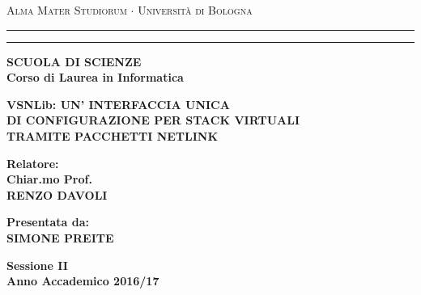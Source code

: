 \documentclass[12pt,a4paper]{report}
\begin{document}
\begin{titlepage}
\begin{center}
{{\Large{\textsc{Alma Mater Studiorum $\cdot$ Universit\`a di
Bologna}}}} \rule[0.1cm]{15.8cm}{0.1mm}
\rule[0.5cm]{15.8cm}{0.6mm}
{\bf SCUOLA DI SCIENZE\\
Corso di Laurea in Informatica }
\end{center}
\vspace{35mm}
\begin{center}
{\Large{\bf VSNLib: UN' INTERFACCIA UNICA }}\\
\vspace{3mm}
{\Large{\bf DI CONFIGURAZIONE PER STACK VIRTUALI }}\\
\vspace{3mm}
{\Large{\bf TRAMITE PACCHETTI NETLINK}}\\
\end{center}
\vspace{40mm}
\par
\noindent
\begin{minipage}[t]{0.47\textwidth}
{\large{\bf Relatore:\\
Chiar.mo Prof.\\
RENZO DAVOLI}}\\
\end{minipage}
\hfill
\begin{minipage}[t]{0.47\textwidth}\raggedleft
{\large{\bf Presentata da:\\
SIMONE PREITE}}
\end{minipage}
\vspace{40mm}
\begin{center}
{\large{\bf Sessione II\\%
Anno Accademico 2016/17}}%
\end{center}
\end{titlepage}
\end{document}

